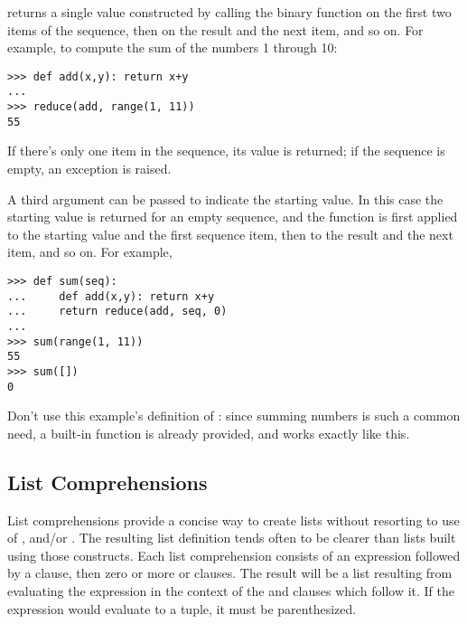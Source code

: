 \documentclass{manual}
\begin{document}
 returns a single value
constructed by calling the binary function  on the first two
items of the sequence, then on the result and the next item, and so
on.  For example, to compute the sum of the numbers 1 through 10:

\begin{verbatim}
>>> def add(x,y): return x+y
...
>>> reduce(add, range(1, 11))
55
\end{verbatim}

If there's only one item in the sequence, its value is returned; if
the sequence is empty, an exception is raised.

A third argument can be passed to indicate the starting value.  In this
case the starting value is returned for an empty sequence, and the
function is first applied to the starting value and the first sequence
item, then to the result and the next item, and so on.  For example,

\begin{verbatim}
>>> def sum(seq):
...     def add(x,y): return x+y
...     return reduce(add, seq, 0)
... 
>>> sum(range(1, 11))
55
>>> sum([])
0
\end{verbatim}

Don't use this example's definition of : since summing
numbers is such a common need, a built-in function
 is already provided, and works exactly like
this.

\subsection{List Comprehensions}

List comprehensions provide a concise way to create lists without resorting
to use of ,  and/or .
The resulting list definition tends often to be clearer than lists built
using those constructs.  Each list comprehension consists of an expression
followed by a  clause, then zero or more  or
 clauses.  The result will be a list resulting from evaluating
the expression in the context of the  and  clauses
which follow it.  If the expression would evaluate to a tuple, it must be
parenthesized.
\end{document}
